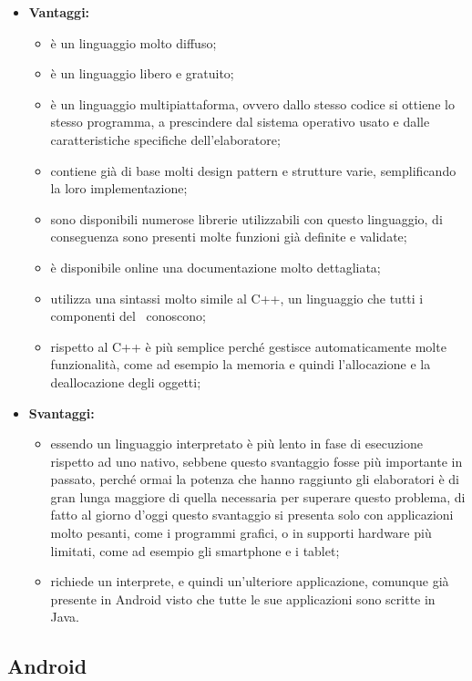 	\begin{itemize}
		\item \textbf{Vantaggi:}
			\begin{itemize}
				\item è un linguaggio molto diffuso;
				\item è un linguaggio libero e gratuito; %
				\item è un linguaggio multipiattaforma, ovvero dallo stesso codice si ottiene lo stesso programma, a prescindere dal sistema operativo usato e dalle caratteristiche specifiche dell'elaboratore;
				\item contiene già di base molti design pattern e strutture varie, semplificando la loro implementazione;
				\item sono disponibili numerose librerie utilizzabili con questo linguaggio, di conseguenza sono presenti molte funzioni già definite e validate;
				\item è disponibile online una documentazione molto dettagliata;
				\item utilizza una sintassi molto simile al C++, un linguaggio che tutti i componenti del \ conoscono;
				\item rispetto al C++ è più semplice perché gestisce automaticamente molte funzionalità, come ad esempio la memoria e quindi l'allocazione e la deallocazione degli oggetti;
			\end{itemize}
		\item \textbf{Svantaggi:}
			\begin{itemize}
				\item essendo un linguaggio interpretato è più lento in fase di esecuzione rispetto ad uno nativo, sebbene questo svantaggio fosse più importante in passato, perché ormai la potenza che hanno raggiunto gli elaboratori è di gran lunga maggiore di quella necessaria per superare questo problema, di fatto al giorno d'oggi questo svantaggio si presenta solo con applicazioni molto pesanti, come i programmi grafici, o in supporti hardware più limitati, come ad esempio gli smartphone e i tablet;
				\item richiede un interprete, e quindi un'ulteriore applicazione, comunque già presente in Android visto che tutte le sue applicazioni sono scritte in Java.
			\end{itemize}
	\end{itemize}
	
\subsection{Android} %

